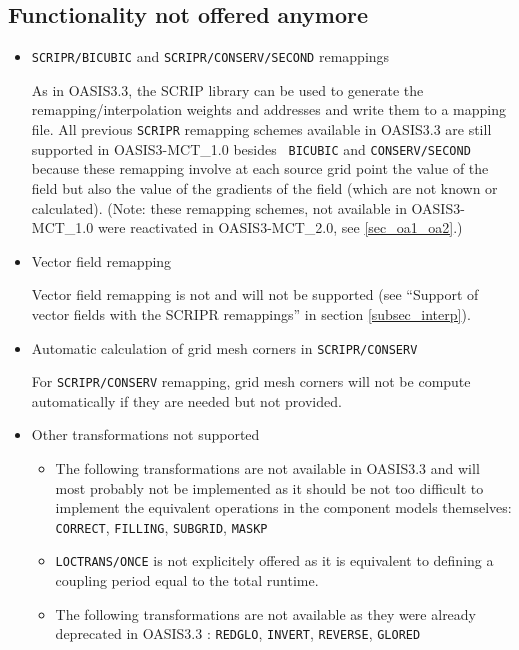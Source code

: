 \subsection{Functionality not offered anymore}
\label{sec_changes_old}

\begin{itemize}

\item {\tt SCRIPR/BICUBIC} and {\tt SCRIPR/CONSERV/SECOND} remappings

As in OASIS3.3, the SCRIP library can be used to generate the
  remapping/interpolation weights and addresses and write them to a
  mapping file. All previous {\tt SCRIPR} remapping
schemes available in OASIS3.3 are still supported in OASIS3-MCT\_1.0 besides {\tt
  BICUBIC} and {\tt CONSERV/SECOND} because these remapping involve
at each source grid point the value of the field but also the value of the
gradients of the field (which are not known or calculated). (Note: these remapping schemes, 
not available in OASIS3-MCT\_1.0 were reactivated in OASIS3-MCT\_2.0, see \ref{sec_oa1_oa2}.)

\item Vector field remapping

Vector field remapping is not and will not be supported (see ``Support
  of vector fields with the SCRIPR remappings'' in section \ref{subsec_interp}).

\item Automatic calculation of grid mesh corners in {\tt SCRIPR/CONSERV}

For {\tt SCRIPR/CONSERV} remapping, grid mesh corners will not
  be compute automatically if they are needed but not provided.  

\item Other transformations not supported

\begin{itemize}

\item The following transformations are not available in OASIS3.3
and will most probably not be implemented as it should be not
too difficult to implement the equivalent operations in the component
models themselves: {\tt CORRECT}, {\tt FILLING}, {\tt SUBGRID}, {\tt MASKP}

\item {\tt LOCTRANS/ONCE} is not explicitely offered as it is equivalent to
defining a coupling period equal to the total runtime.

\item The following transformations are not available as they were already
deprecated in OASIS3.3 : {\tt REDGLO}, {\tt INVERT},
{\tt REVERSE}, {\tt GLORED}


\end{itemize}
\end{itemize}
